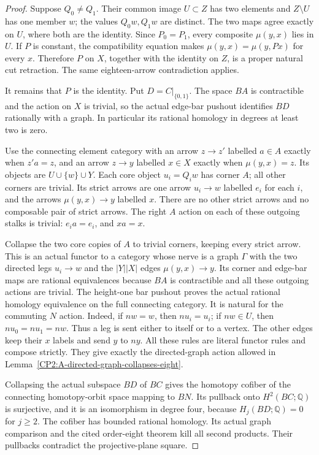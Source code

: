 \begin{proof}
Suppose $Q_0\ne Q_1$.  Their common image $U\subset Z$
has two elements and $Z\setminus U$ has one member $w$;
the values $Q_0w,Q_1w$ are distinct.  The two maps agree
exactly on $U$, where both are the identity.  Since
$P_0=P_1$, every composite $\mu(y,x)$ lies in $U$.
If $P$ is constant, the compatibility equation makes
$\mu(y,x)=\mu(y,Px)$ for every $x$.  Therefore $P$ on
$X$, together with the identity on $Z$, is a proper
natural cut retraction.  The same eighteen-arrow
contradiction applies.

It remains that $P$ is the identity.  Put
$D=C|_{\{0,1\}}$.  The space $BA$ is contractible and
the action on $X$ is trivial, so the actual edge-bar
pushout identifies $BD$ rationally with a graph.
In particular its rational homology in degrees at
least two is zero.

Use the connecting element category with an arrow
$z\to z'$ labelled $a\in A$ exactly when $z'a=z$,
and an arrow $z\to y$ labelled $x\in X$ exactly
when $\mu(y,x)=z$.  Its objects are $U\cup\{w\}\cup Y$.
Each core object $u_i=Q_iw$ has corner $A$; all other
corners are trivial.  Its strict arrows are one arrow
$u_i\to w$ labelled $e_i$ for each $i$, and the arrows
$\mu(y,x)\to y$ labelled $x$.  There are no other
strict arrows and no composable pair of strict arrows.
The right $A$ action on each of these outgoing stalks
is trivial: $e_i a=e_i$, and $xa=x$.

Collapse the two core copies of $A$ to trivial corners,
keeping every strict arrow.  This is an actual functor
to a category whose nerve is a graph $\Gamma$ with
the two directed legs $u_i\to w$ and the $|Y||X|$
edges $\mu(y,x)\to y$.  Its corner and edge-bar maps
are rational equivalences because $BA$ is contractible
and all these outgoing actions are trivial.  The
height-one bar pushout proves the actual rational
homology equivalence on the full connecting category.
It is natural for the commuting $N$ action.  Indeed,
if $nw=w$, then $nu_i=u_i$; if $nw\in U$, then
$nu_0=nu_1=nw$.  Thus a leg is sent either to itself
or to a vertex.  The other edges keep their $x$
labels and send $y$ to $ny$.  All these rules are
literal functor rules and compose strictly.  They
give exactly the directed-graph action allowed in
Lemma~\ref{CP2:A-directed-graph-collapses-eight}.

Collapsing the actual subspace $BD$ of $BC$ gives the
homotopy cofiber of the connecting homotopy-orbit space
mapping to $BN$.  Its pullback onto $H^2(BC;\mathbb Q)$
is surjective, and it is an isomorphism in degree four,
because $H_j(BD;\mathbb Q)=0$ for $j\geq2$.
The cofiber has bounded rational homology.  Its actual
graph comparison and the cited order-eight theorem
kill all second products.  Their pullbacks contradict
the projective-plane square.


\end{proof}
